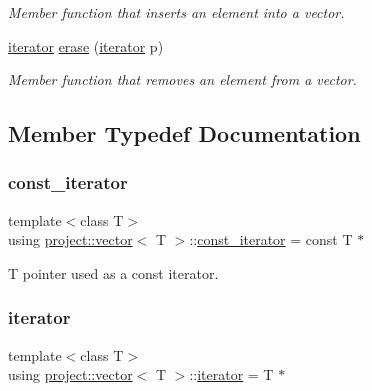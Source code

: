 \begin{DoxyCompactItemize}
\begin{DoxyCompactList}\small\item\em Member function that inserts an element into a vector. \end{DoxyCompactList}\item 
\mbox{\hyperlink{classproject_1_1vector_a429c6a5f47b0de55ac858b3be5aeda8b}{iterator}} \mbox{\hyperlink{classproject_1_1vector_a5eb1005385fe0b2b9df65b32d9152619}{erase}} (\mbox{\hyperlink{classproject_1_1vector_a429c6a5f47b0de55ac858b3be5aeda8b}{iterator}} p)
\begin{DoxyCompactList}\small\item\em Member function that removes an element from a vector. \end{DoxyCompactList}\end{DoxyCompactItemize}


\subsection{Member Typedef Documentation}
\mbox{\label{classproject_1_1vector_ab242a1c8c7abec9b305e502ff7cd0fb2}} 
\subsubsection{\texorpdfstring{const\_iterator}{const\_iterator}}
{\footnotesize\ttfamily template$<$class T$>$ \\
using \mbox{\hyperlink{classproject_1_1vector}{project\+::vector}}$<$ T $>$\+::\mbox{\hyperlink{classproject_1_1vector_ab242a1c8c7abec9b305e502ff7cd0fb2}{const\+\_\+iterator}} =  const T $\ast$}

T pointer used as a const iterator. \mbox{\label{classproject_1_1vector_a429c6a5f47b0de55ac858b3be5aeda8b}} 
\subsubsection{\texorpdfstring{iterator}{iterator}}
{\footnotesize\ttfamily template$<$class T$>$ \\
using \mbox{\hyperlink{classproject_1_1vector}{project\+::vector}}$<$ T $>$\+::\mbox{\hyperlink{classproject_1_1vector_a429c6a5f47b0de55ac858b3be5aeda8b}{iterator}} =  T $\ast$}

